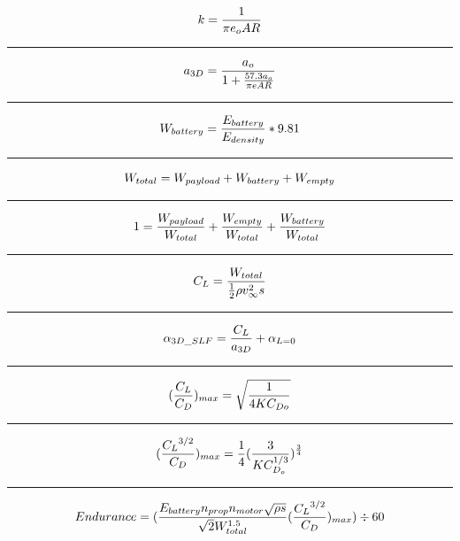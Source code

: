 \documentclass[12pt,A4paper]{article}
\begin{document}
\begin{multicols*}{2}
\begin{equation}
			k = \frac{1}{\pi e_o AR} \\
		\end{equation}
		\hrule
		\vspace{0.1 in}
		\begin{equation}
			a_{3D} = \frac{a_o}{1 + \frac{57.3 a_o}{\pi e AR}} \\
		\end{equation}
		\hrule
		\vspace{0.1 in}
		\begin{equation}
			W_{battery} = \frac{E_{battery}}{E_{density}} *9.81 \\
		\end{equation}
		\hrule
		\vspace{0.1 in}
		\begin{equation}
			W_{total} = W_{payload} + W_{battery} + W_{empty} \\
		\end{equation}
		\hrule
		\vspace{0.1 in}
		\begin{equation}
			1 = \frac{W_{payload}}{W_{total}} + \frac{W_{empty}}{W_{total}} + \frac{W_{battery}}{W_{total}}\\
		\end{equation}
		\hrule
		\vspace{0.1 in}
		\begin{equation}
			C_L = \frac{W_{total}}{\frac{1}{2} \rho  v_\infty^2  s} \\
		\end{equation}
		\hrule
		\vspace{0.1 in}
		\begin{equation}
			\alpha_{3D\_SLF} = \frac{C_L}{a_{3D}}+\alpha_{L=0} \\
		\end{equation}
		\hrule
		\vspace{0.1 in}
		\begin{equation}
			(\frac{C_L}{C_D})_{max} = \sqrt{\frac{1}{4 K C_{D o}}} \\
		\end{equation}
		\hrule
		\vspace{0.1 in}
		\begin{equation}
			(\frac{{C_L}^{3/2}}{C_D})_{max} = \frac{1}{4} (\frac{3}{K C_{D_o}^{1/3}})^{\frac{3}{4}} \\
		\end{equation}
		\hrule
		\vspace{0.1 in}
		\begin{equation}
			Endurance = (\frac{E_{battery} n_{prop} n_{motor} \sqrt{\rho s}}{\sqrt{2} W_{total}^{1.5}} (\frac{{C_L}^{3/2}}{C_D})_{max}) \div 60 \\

\end{equation}
\end{multicols*}
\end{document}
